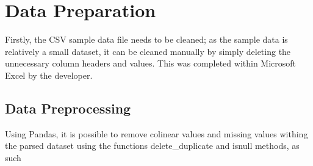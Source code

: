 \section{Data Preparation}

Firstly, the CSV sample data file needs to be cleaned; as the sample data is relatively a small dataset, it can be cleaned manually by simply deleting the unnecessary column headers and values. This was completed within Microsoft Excel by the developer.

\subsection{Data Preprocessing}

Using Pandas, it is possible to remove colinear values and missing values withing the parsed dataset using the functions delete_duplicate and isnull methods, as such

